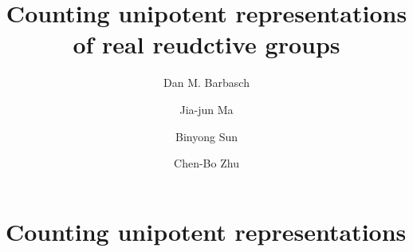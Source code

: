 \documentclass[12pt,a4paper]{amsart}
\def\Im{\operatorname{Im}}
\numberwithin{equation}{section}
\theoremstyle{remark}
\begin{document}
\title[]{Counting unipotent representations of real reudctive groups}

\author [D. Barbasch] {Dan M. Barbasch}
\address{the Department of Mathematics\\
  310 Malott Hall, Cornell University, Ithaca, New York 14853 }

\author [J.-J. Ma] {Jia-jun Ma}
\address{School of Mathematical Sciences\\
  Shanghai Jiao Tong University\\
  800 Dongchuan Road, Shanghai, 200240, China} 

\author [B. Sun] {Binyong Sun}
\address{Academy of Mathematics and Systems Science\\
  Chinese Academy of Sciences\\
  Beijing, 100190, China} 

\author [C.-B. Zhu] {Chen-Bo Zhu}
\address{Department of Mathematics\\
  National University of Singapore\\
  10 Lower Kent Ridge Road, Singapore 119076} 




 

\maketitle


\tableofcontents

\section{Counting unipotent representations}
\def\Gc{G_\bC}
\def\hha{{}^a\fhh}
\def\aX{{}^aX}
\def\aQ{{}^aQ}
\def\aP{{}^aP}
\def\aR{{}^aR}
\def\aRp{{}^aR^+}
\def\asRp{{}^a \Delta^+}
\def\Gfin{\cG(\Gc)}
\def\PiGfin{\Pi_{\mathrm{fin}}( \Gc )}
\def\PiGlfin{\Pi_{\Lambda_0}( \Gc )}
\def\adGfin{\cG_{\mathrm{ad}}(\Gc)}
\def\Ggk{\cG(\fgg,K)}
\def\WT#1{\Delta(F)}
\def\WG{W(\Gc)}
\def\Wlam{W(\lambda)}
\def\Rlam{R(\lambda)}
\def\Rplam{R^+(\lambda)}
\def\Glfin{\cG_{\Lambda}(\Gc)}

\def\Con{\sfC}
\def\bCon{\overline{\sfC}}
\def\Re{\mathrm{Re}}
\def\Im{\mathrm{Im}}
\def\AND{\quad \text{and} \quad}
\def\Coh{\mathrm{Coh}}
\def\Cohlm{\Coh_{\Lambda}(\cM)}
\def\ev#1{{\mathrm{ev}_{#1}}}
\end{document}
